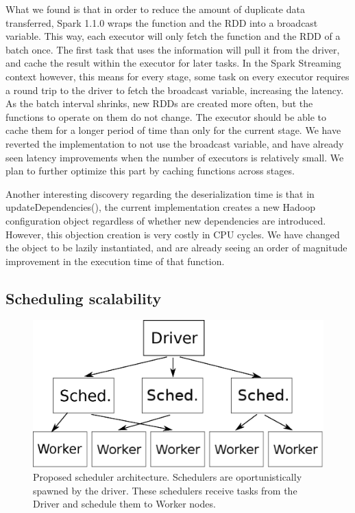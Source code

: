 What we found is that in order to reduce the amount of duplicate data transferred, Spark 1.1.0 wraps the function and the RDD into a broadcast variable. This way, each executor will only fetch the function and the RDD of a batch once. The first task that uses the information will pull it from the driver, and cache the result within the executor for later tasks. In the Spark Streaming context however, this means for every stage, some task on every executor requires a round trip to the driver to fetch the broadcast variable, increasing the latency. As the batch interval shrinks, new RDDs are created more often, but the functions to operate on them do not change. The executor should be able to cache them for a longer period of time than only for the current stage. We have reverted the implementation to not use the broadcast variable, and have already seen latency improvements when the number of executors is relatively small. We plan to further optimize this part by caching functions across stages.

Another interesting discovery regarding the deserialization time is that in updateDependencies(), the current implementation creates a new Hadoop configuration object regardless of whether new dependencies are introduced. However, this objection creation is very costly in CPU cycles. We have changed the object to be lazily instantiated, and are already seeing an order of magnitude improvement in the execution time of that function.


\subsection{Scheduling scalability}

\begin{figure}[h!]
  \begin{center}
    \includegraphics[scale=0.45]{scheduler_architecture.eps}
  \end{center}
  \caption{Proposed scheduler architecture. Schedulers are oportunistically spawned by the driver. These schedulers receive tasks from the Driver and schedule them to Worker nodes.}
  \label{fig:schedarch}
\end{figure}


